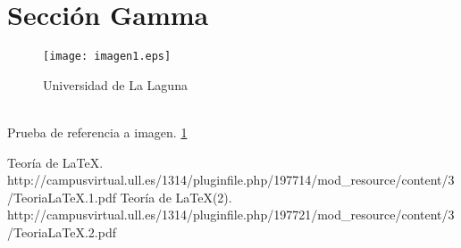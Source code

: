 \documentclass[spanish,a4paper,10pt]{article}
\begin{document}
\section{Sección Gamma}
\begin{figure}[h]
\begin{center}
\texttt{[image: imagen1.eps]} \end{center}
\caption{Universidad de La Laguna}
\label{Imagen}
\end{figure}
\\Prueba de referencia a imagen. \ref{Imagen}

\begin{thebibliography}{1}
 Teoría de \LaTeX{}. \\http://campusvirtual.ull.es/1314/pluginfile.php/197714/mod_resource/content/3/TeoriaLaTeX.1.pdf
 Teoría de \LaTeX{}(2). \\http://campusvirtual.ull.es/1314/pluginfile.php/197721/mod_resource/content/3/TeoriaLaTeX.2.pdf
\end{thebibliography}
\end{document}
